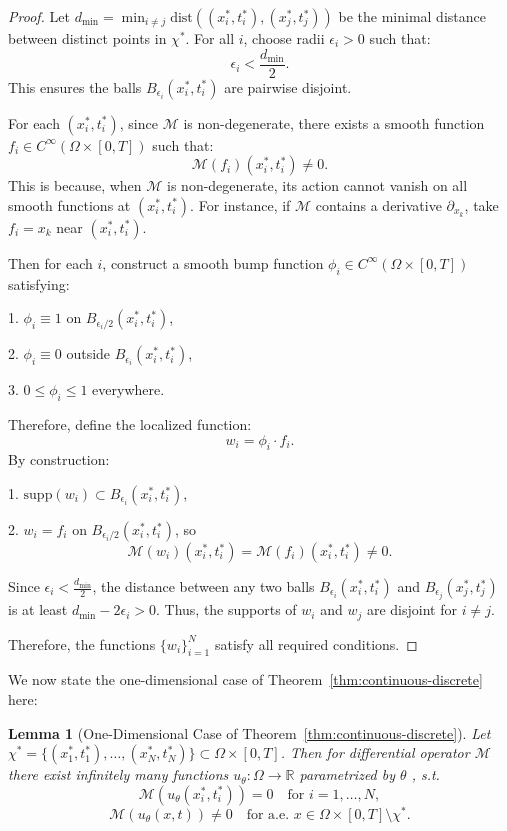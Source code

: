 \documentclass{article}
\theoremstyle{plain}
\newtheorem{lemma}[theorem]{Lemma}
\theoremstyle{definition}
\theoremstyle{remark}
\begin{document}
\begin{proof}
    Let $d_{\text{min}} = \min_{i \neq j} \text{dist}\left((x^*_i,t^*_i), (x^*_j,t^*_j)\right)$ be the minimal distance between distinct points in $\chi^*$. For all $i$, choose radii $\epsilon_i > 0$ such that:  
$$
\epsilon_i < \frac{d_{\text{min}}}{2}.
$$  
This ensures the balls $B_{\epsilon_i}(x^*_i,t^*_i)$ are pairwise disjoint.  

For each $(x^*_i,t^*_i)$, since $\mathcal{M}$ is non-degenerate, there exists a smooth function $f_i \in C^\infty(\Omega \times [0,T])$ such that:  
$$
\mathcal{M}(f_i)(x^*_i,t^*_i) \neq 0.
$$  This is because, when $\mathcal{M}$ is non-degenerate, its action cannot vanish on all smooth functions at $(x^*_i,t^*_i)$. For instance, if $\mathcal{M}$ contains a derivative $\partial_{x_k}$, take $f_i = x_k$ near $(x^*_i,t^*_i)$.

Then for each $i$, construct a smooth bump function $\phi_i \in C^\infty(\Omega \times [0,T])$ satisfying:  

1. $\phi_i \equiv 1$ on $B_{\epsilon_i/2}(x^*_i,t^*_i)$, 

2. $\phi_i \equiv 0$ outside $B_{\epsilon_i}(x^*_i,t^*_i)$, 

3. $0 \leq \phi_i \leq 1$ everywhere.  

Therefore, define the localized function:  
$$
w_i = \phi_i \cdot f_i.
$$  
By construction:  

1. $\text{supp}(w_i) \subset B_{\epsilon_i}(x^*_i,t^*_i)$,

2. $w_i = f_i$ on $B_{\epsilon_i/2}(x^*_i,t^*_i)$, so  
$$
\mathcal{M}(w_i)(x^*_i,t^*_i) = \mathcal{M}(f_i)(x^*_i,t^*_i) \neq 0.
$$  

Since $\epsilon_i < \frac{d_{\text{min}}}{2}$, the distance between any two balls $B_{\epsilon_i}(x^*_i,t^*_i)$ and $B_{\epsilon_j}(x^*_j,t^*_j)$ is at least $d_{\text{min}} - 2\epsilon_i > 0$. Thus, the supports of $w_i$ and $w_j$ are disjoint for $i \neq j$. 

Therefore, the functions $\{w_i\}_{i=1}^N$ satisfy all required conditions.  


\end{proof}



We now state the one-dimensional case of Theorem~\ref{thm:continuous-discrete} here:

\begin{lemma}[One-Dimensional Case of Theorem~\ref{thm:continuous-discrete}]
\label{lemma:1d}
    Let $\chi^* = \{(x^*_1,t^*_1),\dots,(x^*_N,t^*_N)\}\subset \Omega\times[0,T]$. Then for differential operator $\mathcal M$ there exist infinitely many functions
$u_\theta : \Omega \to \mathbb{R}$ parametrized by $\theta$ , s.t.
$$ \mathcal{M}(u_\theta(x^*_i,t^*_i)) = 0 \quad \text{for } i=1,\dots,N,$$ $$ 
   \mathcal{M}(u_\theta(x,t)) \neq 0
   \quad \text{for a.e. } x \in \Omega\times[0,T] \setminus \chi^*.$$
\end{lemma}
\end{document}
